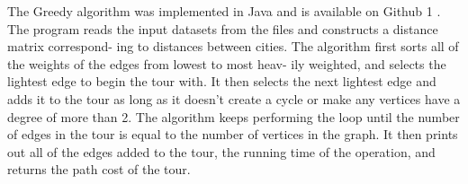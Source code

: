 \documentclass[10pt,twocolumn,letterpaper]{article}
\begin{document}
The Greedy algorithm was implemented in Java and is
available on Github 1 . The program reads the input datasets
from the files and constructs a distance matrix correspond-
ing to distances between cities. The algorithm first sorts
all of the weights of the edges from lowest to most heav-
ily weighted, and selects the lightest edge to begin the tour
with. It then selects the next lightest edge and adds it to
the tour as long as it doesn’t create a cycle or make any
vertices have a degree of more than 2. The algorithm keeps
performing the loop until the number of edges in the tour is
equal to the number of vertices in the graph. It then prints
out all of the edges added to the tour, the running time of
the operation, and returns the path cost of the tour.

{\small


}
\end{document}
